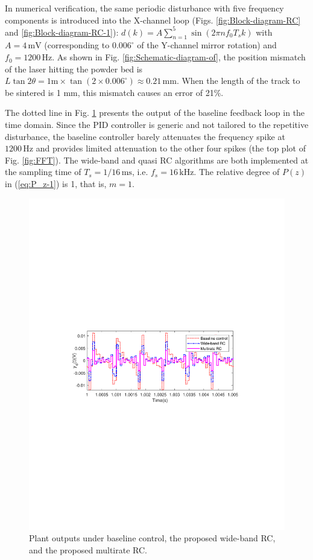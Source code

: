 \documentclass [11pt, proquest] {uwthesis}[2020/02/24]
\begin{document}
In numerical verification, the same periodic disturbance with five
frequency components is introduced into the X-channel loop (Figs.
\ref{fig:Block-diagram-RC} and \ref{fig:Block-diagram-RC-1}): $d(k)=A\sum_{n=1}^{5}\sin(2\pi nf_{0}T_{s}k)$
with $A=4\,\text{mV}$ (corresponding to $0.006^{\circ}$ of the Y-channel
mirror rotation) and $f_{0}=1200\,\text{Hz}$. As shown in Fig. \ref{fig:Schematic-diagram-of},
the position mismatch of the laser hitting the powder bed is $L\tan2\theta=1\text{m}\times\tan(2\times0.006^{\circ})\approx0.21\,\text{mm}$.
When the length of the track to be sintered is 1 mm, this mismatch
causes an error of 21\%. 

The dotted line in Fig. \ref{fig:Yd(t)_wideband-multirate} presents
the output of the baseline feedback loop in the time domain. Since
the PID controller is generic and not tailored to the repetitive disturbance,
the baseline controller barely attenuates the frequency spike at $1200\,\text{Hz}$
and provides limited attenuation to the other four spikes (the top
plot of Fig. \ref{fig:FFT}).
The wide-band and quasi RC algorithms are both implemented at the
sampling time of $T_{s}=1/16\,\text{ms}$, i.e. $f_{s}=16\,\text{kHz}$.
The relative degree of $P(z)$ in (\ref{eq:P_z-1}) is 1, that is,
$m=1$.
\begin{figure}[!ht]
\begin{centering}
\includegraphics[width=12cm]{Fractional-order-RC/wideband_baseline_multirate_time}
\par\end{centering}
\caption{\label{fig:Yd(t)_wideband-multirate}Plant outputs under baseline
control, the proposed wide-band RC, and the proposed multirate RC.}
\end{figure}
\end{document}
